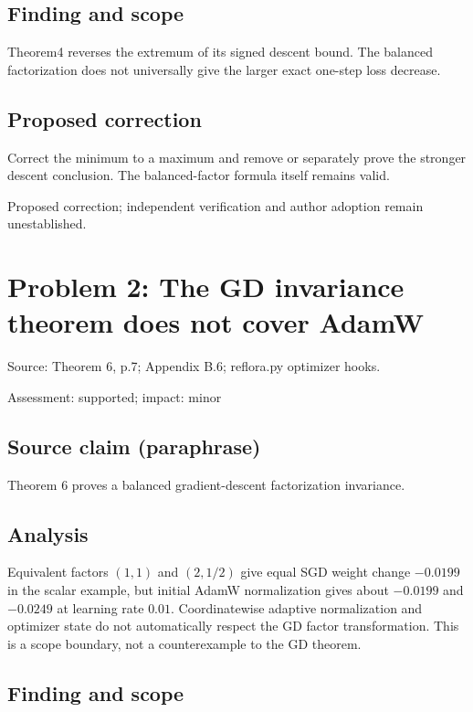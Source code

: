 \documentclass[11pt]{article}
\begin{document}
\subsection*{Finding and scope}

Theorem4 reverses the extremum of its signed descent bound. The balanced factorization does not universally give the larger exact one-step loss decrease.

\subsection*{Proposed correction}

Correct the minimum to a maximum and remove or separately prove the stronger descent conclusion. The balanced-factor formula itself remains valid.

Proposed correction; independent verification and author adoption remain unestablished.

\section*{Problem 2: The GD invariance theorem does not cover AdamW}

Source: Theorem 6, p.7; Appendix B.6; reflora.py optimizer hooks.

Assessment: supported; impact: minor

\subsection*{Source claim (paraphrase)}

Theorem 6 proves a balanced gradient-descent factorization invariance.

\subsection*{Analysis}

Equivalent factors \((1,1)\) and \((2,1/2)\) give equal SGD weight change \(-0.0199\) in the scalar example, but initial AdamW normalization gives about \(-0.0199\) and \(-0.0249\) at learning rate \(0.01\). Coordinatewise adaptive normalization and optimizer state do not automatically respect the GD factor transformation. This is a scope boundary, not a counterexample to the GD theorem.

\subsection*{Finding and scope}
\end{document}
